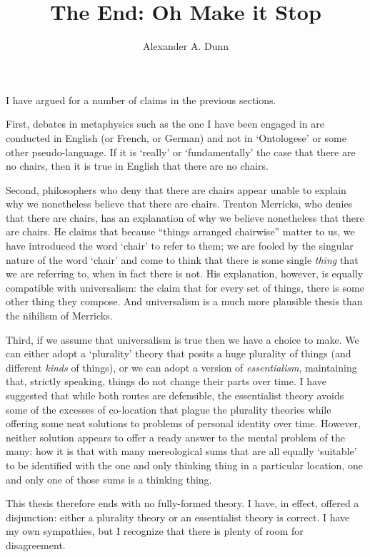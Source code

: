 \documentclass[11pt]{article}
\title{The End: Oh Make it Stop}
\author{Alexander A. Dunn}
\begin{document}
\ifstandalone
\maketitle
\begin{spacing}{1.5}
\fi

I have argued for a number of claims in the previous sections.

First, debates in metaphysics such as the one I have been engaged in
are conducted in English (or French, or German) and not in
`Ontologese' or some other pseudo-language.  If it is `really' or
`fundamentally' the case that there are no chairs, then it is true in
English that there are no chairs.

Second, philosophers who deny that there are chairs appear unable to
explain why we nonetheless believe that there are chairs.  Trenton
Merricks, who denies that there are chairs, has an explanation of why
we believe nonetheless that there are chairs.  He claims that because
``things arranged chairwise'' matter to us, we have introduced the
word `chair' to refer to them; we are fooled by the singular nature of
the word `chair' and come to think that there is some single {\em
  thing} that we are referring to, when in fact there is not.  His
explanation, however, is equally compatible with universalism: the
claim that for every set of things, there is some other thing they
compose.  And universalism is a much more plausible thesis than the
nihilism of Merricks.

Third, if we assume that universalism is true then we have a choice to
make.  We can either adopt a `plurality' theory that posits a huge
plurality of things (and different {\em kinds} of things), or we can
adopt a version of {\em essentialism}, maintaining that, strictly
speaking, things do not change their parts over time.  I have
suggested that while both routes are defensible, the essentialist
theory avoids some of the excesses of co-location that plague the
plurality theories while offering some neat solutions to problems of
personal identity over time.  However, neither solution appears to
offer a ready answer to the mental problem of the many: how it is that
with many mereological sums that are all equally `suitable' to be
identified with the one and only thinking thing in a particular
location, one and only one of those sums is a thinking thing.

This thesis therefore ends with no fully-formed theory.  I have, in
effect, offered a disjunction: either a plurality theory or an
essentialist theory is correct.  I have my own sympathies, but I
recognize that there is plenty of room for disagreement.

\ifstandalone
\end{spacing}


\fi
\end{document}
